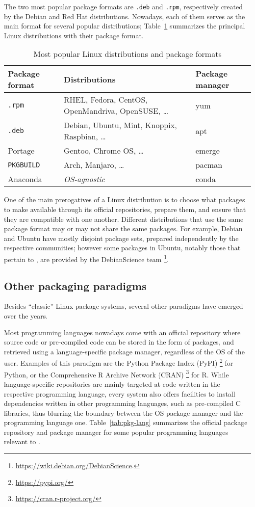 \documentclass{deliverablereport}
\begin{document}
The two most popular package formats are \texttt{.deb} and
\texttt{.rpm}, respectively created by the Debian and Red Hat
distributions. %
Nowadays, each of them serves as the main format for several popular
distributions; Table~\ref{tab:pkg-fmt} summarizes the principal Linux
distributions with their package format.

\begin{table}
  \centering
  \begin{tabular}{l | p{} | l}
    Package format & Distributions & Package manager\\
    \hline
    \texttt{.rpm} & RHEL, Fedora, CentOS, OpenMandriva, OpenSUSE, \dots & yum\\
    \texttt{.deb} & Debian, Ubuntu, Mint, Knoppix, Raspbian, \dots & apt \\
    Portage & Gentoo, Chrome OS, \dots & emerge\\
    \texttt{PKGBUILD} & Arch, Manjaro, \dots & pacman\\
    Anaconda & \emph{OS-agnostic} & conda
  \end{tabular}
  \caption{Most popular Linux distributions and package formats}
  \label{tab:pkg-fmt}
\end{table}

One of the main prerogatives of a Linux distribution is to choose what
packages to make available through its official repositories, prepare
them, and ensure that they are compatible with one another. %
Different distributions that use the same package format may or may
not share the same packages. %
For example, Debian and Ubuntu have mostly disjoint package sets,
prepared independently by the respective communities; however some
packages in Ubuntu, notably those that pertain to \ODK, are provided
by the DebianScience team%
\footnote{\url{https://wiki.debian.org/DebianScience}.}.

\subsection{Other packaging paradigms}

Besides ``classic'' Linux package systems, several other paradigms
have emerged over the years.

Most programming languages nowadays come with an official repository
where source code or pre-compiled code can be stored in the form of
packages, and retrieved using a language-specific package manager,
regardless of the OS of the user. %
Examples of this paradigm are the Python Package Index (PyPI)%
\footnote{\url{https://pypi.org/}} %
for Python, or the Comprehensive R Archive Network (CRAN)%
\footnote{\url{https://cran.r-project.org/}} %
for R. %
While language-specific repositories are mainly targeted at code
written in the respective programming language, every system also
offers facilities to install dependencies written in other programming
languages, such as pre-compiled C libraries, thus blurring the
boundary between the OS package manager and the programming language
one. %
Table~\ref{tab:pkg-lang} summarizes the official package repository
and package manager for some popular programming languages relevant to
\ODK.
\end{document}
